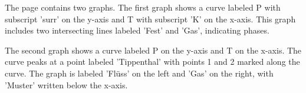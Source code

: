 The page contains two graphs. The first graph shows a curve labeled P with subscript 'surr' on the y-axis and T with subscript 'K' on the x-axis. This graph includes two intersecting lines labeled 'Fest' and 'Gas', indicating phases. 

The second graph shows a curve labeled P on the y-axis and T on the x-axis. The curve peaks at a point labeled 'Tippenthal' with points 1 and 2 marked along the curve. The graph is labeled 'Flüss' on the left and 'Gas' on the right, with 'Muster' written below the x-axis.